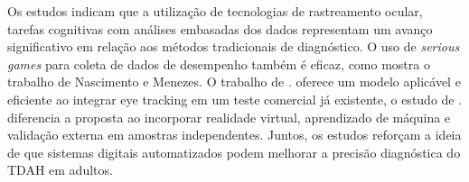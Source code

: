 Os estudos indicam que a utilização de tecnologias de rastreamento ocular, tarefas
cognitivas com análises embasadas dos dados representam um avanço significativo em
relação aos métodos tradicionais de diagnóstico. O uso de \textit{serious games} para coleta de
dados de desempenho também é eficaz, como mostra o trabalho de Nascimento e Menezes.
O trabalho de \textcite{Elbaum2020}. oferece um modelo aplicável e eficiente ao integrar eye tracking
em um teste comercial já existente, o estudo de \textcite{Wiebe2024}. diferencia a proposta ao
incorporar realidade virtual, aprendizado de máquina e validação externa em amostras
independentes. Juntos, os estudos reforçam a ideia de que sistemas digitais automatizados
podem melhorar a precisão diagnóstica do TDAH em adultos.

